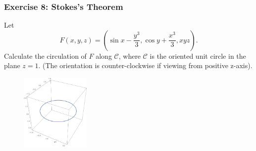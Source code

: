 \documentclass[11pt, t]{beamer}
\begin{document}
\begin{frame}
    \frametitle{Exercise 8: Stokes's Theorem}
    Let $${F}(x, y, z)=\left(\sin x-\dfrac{y^{3}}{3}, \cos y+\dfrac{x^{3}}{3}, x y z\right).$$ Calculate the circulation of $F$ along $\mathcal{C}$, where $\mathcal{C}$ is the oriented unit circle in the plane $z=1$. (The orientation is counter-clockwise if viewing from positive z-axis).
    \begin{figure}[H]
        \centering
        \includegraphics[width=0.3\textwidth]{Figures/p3.pdf}
    \end{figure}
\end{frame}
\end{document}
